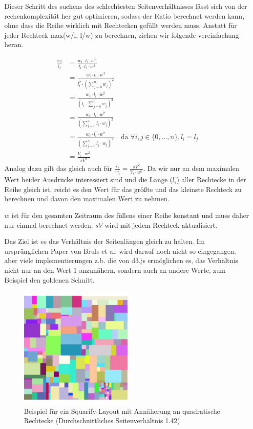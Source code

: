 Dieser Schritt des suchens des schlechtesten Seitenverhältnisses lässt sich von der rechenkomplexität her gut optimieren, sodass der Ratio berechnet werden kann, ohne dass die Reihe wirklich mit Rechtecken gefüllt werden muss. 
Anstatt für jeder Rechteck max(w/l, l/w) zu berechnen, ziehen wir folgende vereinfachung heran.

\begin{align}
    \frac{w_i}{l_i} 
    &= \frac{w_i \cdot l_i \cdot w^2}{l_i \cdot l_i \cdot w^2} \\
    &= \frac{w_i \cdot l_i \cdot w^2}{l_i^2 \cdot \left(\sum_{j=0}^{n} w_j\right)^2} \\
    &= \frac{w_i \cdot l_i \cdot w^2}{\left(l_i \cdot \sum_{j=0}^{n} w_j\right)^2} \\
    &= \frac{w_i \cdot l_i \cdot w^2}{\left(\sum_{j=0}^{n} l_i \cdot w_j\right)^2} \\
    &= \frac{w_i \cdot l_i \cdot w^2}{\left(\sum_{j=0}^{n} l_j \cdot w_j\right)^2}
    \quad\text{da } \forall i, j \in \{0, \dots, n\}, l_i = l_j \\
    &= \frac{V_i \cdot w^2}{sV^2}
\end{align}
Analog dazu gilt das gleich auch für $ \frac{l_i}{w_i} = \frac{sV^2}{V_i \cdot w^2} $. Da wir nur an dem maximalen Wert beider Ausdrücke interessiert sind und die Länge ($l_i$) aller Rechtecke in der Reihe gleich ist, reicht es den Wert für das größte und das kleinste Rechteck zu berechnen und davon den maximalen Wert zu nehmen.

$w$ ist für den gesamten Zeitraum des füllens einer Reihe konstant und muss daher nur einmal berechnet werden. $sV$ wird mit jedem Rechteck aktualisiert. 

Das Ziel ist es das Verhältnis der Seitenlängen gleich zu halten. Im ursprünglichen Paper von Bruls et al. \cite{bruls2000squarified} wird darauf noch nicht so eingegangen, aber viele implementierungen z.b. die von d3.js \cite{d3_treemap_code} ermöglichen es, das Verhältnis nicht nur an den Wert 1 anzunähern, sondern auch an andere Werte, zum Beispiel den goldenen Schnitt. 

\begin{figure}[h]
    \centering
    \includegraphics[width=0.5\textwidth]{images/oneSquarify.png}
    \caption{Beispiel für ein Squarify-Layout mit Annäherung an quadratische Rechtecke (Durchschnittliches Seitenverhältnis 1.42)}
    \label{fig:squarifyRatio1}
\end{figure}

